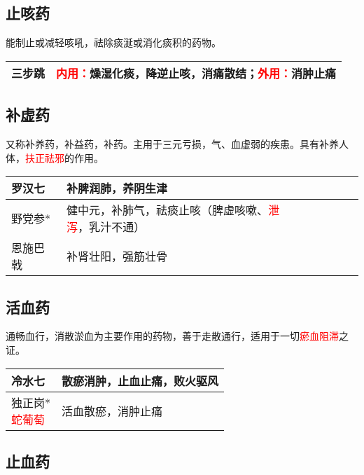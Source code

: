\documentclass[cn,hazy,blue,12pt,normal,founder]{elegantnote}
\newcommand{\redt}[1]{\textcolor{red}{{}#1}}      %
\begin{document}
\subsection{止咳药}

能制止或减轻咳吼，祛除痰涎或消化痰积的药物。

\begin{table}[H]
  \begin{tabular}{|l|l|}
  \hline
  三步跳 & \redt{内用：}燥湿化痰，降逆止咳，消痛散结；\redt{外用：}消肿止痛     \\ \hline
  \end{tabular}
\end{table}

\subsection{补虚药}

又称补养药，补益药，补药。主用于三元亏损，气、血虚弱的疾患。具有补养人体，\redt{扶正祛邪}的作用。

\begin{table}[H]
  \begin{tabular}{|l|l|}
  \hline
  罗汉七 & 补脾润肺，养阴生津 \\ \hline
  野党参* & 健中元，补肺气，祛痰止咳（脾虚咳嗽、\redt{泄泻}，乳汁不通）  \\  \hline
  恩施巴戟 & 补肾壮阳，强筋壮骨 \\ \hline
  \end{tabular}
\end{table}

\subsection{活血药}

通畅血行，消散淤血为主要作用的药物，善于走散通行，适用于一切\redt{瘀血阻滞}之证。

\begin{table}[H]
  \begin{tabular}{|l|l|}
  \hline
  冷水七 & 散瘀消肿，止血止痛，败火驱风 \\ \hline
  \makecell[l]{独正岗* \\ \redt{蛇葡萄}} & 活血散瘀，消肿止痛  \\  \hline
  \end{tabular}
\end{table}

\subsection{止血药}
\end{document}
